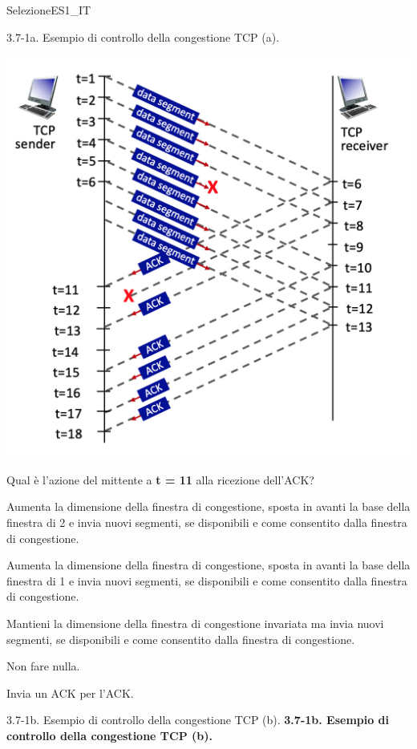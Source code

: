 \documentclass[a4paper]{article}
\begin{document}
\begin{quiz}{SelezioneES1\_IT}
\begin{multi}[points=1,shuffle]{3.7-1a. Esempio di controllo della congestione TCP (a).}
\begin{center}
\includegraphics[width=\linewidth]{figs/tcp_seq_ack_1.jpg}
\end{center}

Qual è l'azione del mittente a \textbf{t = 11} alla ricezione dell'ACK?
\item Aumenta la dimensione della finestra di congestione, sposta in avanti la base della finestra di 2 e invia nuovi segmenti, se disponibili e come consentito dalla finestra di congestione.
\item* Aumenta la dimensione della finestra di congestione, sposta in avanti la base della finestra di 1 e invia nuovi segmenti, se disponibili e come consentito dalla finestra di congestione.
\item Mantieni la dimensione della finestra di congestione invariata ma invia nuovi segmenti, se disponibili e come consentito dalla finestra di congestione.
\item Non fare nulla.
\item Invia un ACK per l'ACK.
\end{multi}

\begin{multi}[points=1,shuffle]{3.7-1b. Esempio di controllo della congestione TCP (b).}
\textbf{3.7-1b. Esempio di controllo della congestione TCP (b).}


\end{multi}
\end{quiz}
\end{document}
